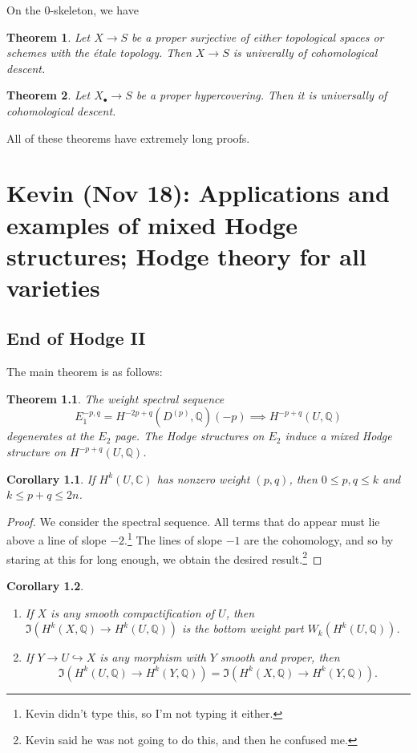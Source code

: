 \documentclass[leqno, openany]{memoir}
\newtheorem{thm}{Theorem}[section]
\newtheorem{cor}[thm]{Corollary}
\theoremstyle{definition}
\theoremstyle{remark}
\theoremstyle{plain}
\newtheorem*{thm*}{Theorem}
\theoremstyle{definition}
\theoremstyle{remark}
\newcommand{\C}{\mathbb{C}}
\newcommand{\Q}{\mathbb{Q}}
\begin{document}
On the $0$-skeleton, we have
\begin{thm}
    Let $X \to S$ be a proper surjective of either topological spaces or schemes with the \'etale topology. Then $X \to S$ is univerally of cohomological descent.
\end{thm}

\begin{thm}
    Let $X_{\bullet} \to S$ be a proper hypercovering. Then it is universally of cohomological descent.
\end{thm}

All of these theorems have extremely long proofs.

\chapter{Kevin (Nov 18): Applications and examples of mixed Hodge structures; Hodge theory for all varieties}%
\label{cha:kevin_nov_18_}

\section{End of Hodge II}%
\label{sec:end_of_hodge_ii}

The main theorem is as follows:
\begin{thm*}
    The weight spectral sequence
    \[ E_1^{-p,q} = H^{-2p+q}(D^{(p)}, \Q)(-p) \implies H^{-p+q}(U, \Q) \]
    degenerates at the $E_2$ page. The Hodge structures on $E_2$ induce a mixed Hodge structure on $H^{-p+q}(U, \Q)$.
\end{thm*}

\begin{cor}
    If $H^k(U, \C)$ has nonzero weight $(p, q)$, then $0 \leq p,q \leq k$ and $k \leq p + q \leq 2n$.
\end{cor}

\begin{proof}
    We consider the spectral sequence. All terms that do appear must lie above a line of slope $-2$.\footnote{Kevin didn't type this, so I'm not typing it either.} The lines of slope $-1$ are the cohomology, and so by staring at this for long enough, we obtain the desired result.\footnote{Kevin said he was not going to do this, and then he confused me.}
\end{proof}

\begin{cor}\leavevmode
    \begin{enumerate}
        \item If $X$ is any smooth compactification of $U$, then $\Im(H^k(X, \Q) \to H^k(U, \Q))$ is the bottom weight part $W_k(H^k(U, \Q))$.
        \item If $Y \to U \hookrightarrow X$ is any morphism with $Y$ smooth and proper, then 
            \[ \Im(H^k(U, \Q) \to H^k(Y, \Q)) = \Im(H^k(X, \Q) \to H^k(Y, \Q)). \]
    \end{enumerate}
\end{cor}
\end{document}
